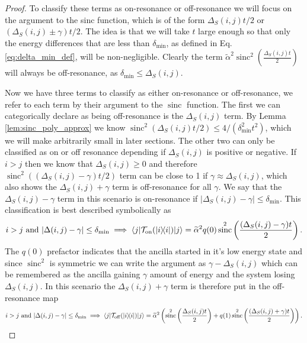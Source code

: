\documentclass{article}
\newcommand{\on}{\rm on}
\newcommand{\off}{\rm off}
\newcommand{\ket}[1]{|#1\rangle}
\newcommand{\bra}[1]{\langle #1|}
\newcommand{\ketbra}[2]{| #1\rangle\! \langle #2|}
\DeclareMathOperator{\sinc}{sinc}
\begin{document}
\begin{proof}
    To classify these terms as on-resonance or off-resonance we will focus on the argument to the sinc function, which is of the form $\Delta_S(i,j) t/ 2$ or $(\Delta_S(i,j) \pm \gamma) t/ 2$. The idea is that we will take $t$ large enough so that only the energy differences that are less than $\delta_{\min}$, as defined in Eq. \eqref{eq:delta_min_def}, will be non-negligible. Clearly the term $\widetilde{\alpha}^2 \sinc^2 \left( \frac{\Delta_S(i,j)t}{2} \right)$ will always be off-resonance, as $\delta_{\min} \le \Delta_S(i,j)$. 
    
    Now we have three terms to classify as either on-resonance or off-resonance, we refer to each term by their argument to the $\sinc$ function. The first we can categorically declare as being off-resonance is the $\Delta_S(i,j)$ term. By Lemma \ref{lem:sinc_poly_approx} we know $\sinc^2(\Delta_S(i,j) t/ 2) \le 4 / (\delta_{\min}^2 t^2)$, which we will make arbitrarily small in later sections. The other two can only be classified as on or off resonance depending if $\Delta_S(i,j)$ is positive or negative. If $i > j$ then we know that $\Delta_S(i,j) \ge 0$ and therefore $\sinc^2((\Delta_S(i,j) - \gamma)t/2)$ term can be close to 1 if $\gamma \approx \Delta_{S}(i,j)$, which also shows the $\Delta_S(i,j) + \gamma$ term is off-resonance for all $\gamma$. We say that the $\Delta_S(i,j) - \gamma$ term in this scenario is on-resonance if $|\Delta_S(i,j) - \gamma| \le \delta_{\min}$. This classification is best described symbolically as
    \begin{equation}
    i > j \text{ and } |\Delta(i,j) - \gamma| \le \delta_{\min} \implies  \bra{j} \mathcal{T}_{\on}(\ketbra{i}{i}) \ket{j} = \widetilde{\alpha}^2 q(0) \sinc^2 \left( \frac{(\Delta_S(i,j) - \gamma)t}{2} \right).\label{eq:on_resonance_i_geq_j}
    \end{equation}
    The $q(0)$ prefactor indicates that the ancilla started in it's low energy state and since $\sinc^2$ is symmetric we can write the argument as $\gamma - \Delta_S(i,j)$ which can be remembered as the ancilla gaining $\gamma$ amount of energy and the system losing $\Delta_S(i,j)$. In this scenario the $\Delta_S(i,j) + \gamma$ term is therefore put in the off-resonance map
    \begin{align}
        i > j \text{ and } |\Delta(i,j) - \gamma| \le \delta_{\min} \implies  \bra{j} \mathcal{T}_{\off}(\ketbra{i}{i}) \ket{j} = \widetilde{\alpha}^2\left( \sinc^2 \left( \frac{\Delta_S(i,j) t}{2} \right) + q(1) \sinc^2 \left(\frac{(\Delta_S(i,j) + \gamma) t}{2} \right) \right).
    \end{align}
    

\end{proof}
\end{document}
